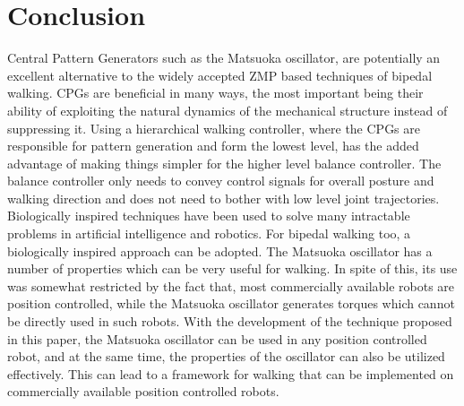 \documentclass[12pt,twoside]{article}
\theoremstyle{plain}
\theoremstyle{definition}
\theoremstyle{remark}
\newcommand{\forceindent}{\leavevmode{\parindent=2em\indent}}
\begin{document}
\section{Conclusion}
\label{sec:Conclusion}
Central Pattern Generators such as the Matsuoka oscillator, are potentially an excellent alternative to the widely accepted ZMP based techniques of bipedal walking. CPGs are beneficial in many ways, the most important being their ability of exploiting the natural dynamics of the mechanical structure instead of suppressing it. Using a hierarchical walking controller, where the CPGs are responsible for pattern generation and form the lowest level, has the added advantage of making things simpler for the higher level balance controller. The balance controller only needs to convey control signals for overall posture and walking direction and does not need to bother with low level joint trajectories.\\
\forceindent Biologically inspired techniques have been used to solve many intractable problems in artificial intelligence and robotics. For bipedal walking too, a biologically inspired approach can be adopted. The Matsuoka oscillator has a number of properties which can be very useful for walking. In spite of this, its use was somewhat restricted by the fact that, most commercially available robots are position controlled, while the Matsuoka oscillator generates torques which cannot be directly used in such robots. With the development of the technique proposed in this paper, the Matsuoka oscillator can be used in any position controlled robot, and at the same time, the properties of the oscillator can also be utilized effectively. This can lead to a framework for walking that can be implemented on commercially available position controlled robots.
\end{document}

